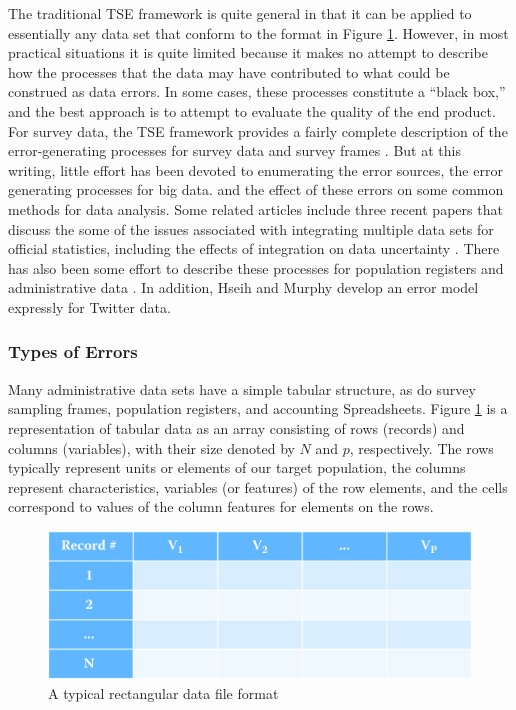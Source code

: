 \documentclass[]{krantz}
\begin{document}
The traditional TSE framework is quite general in that it can be applied
to essentially any data set that conform to the format in Figure
\ref{fig:fig10-1}. However, in most practical situations it is quite
limited because it makes no attempt to describe how the processes that
the data may have contributed to what could be construed as data errors.
In some cases, these processes constitute a ``black box,'' and the best
approach is to attempt to evaluate the quality of the end product. For
survey data, the TSE framework provides a fairly complete description of
the error-generating processes for survey data and survey frames
\citep{biemer2010total}. But at this writing, little effort has been
devoted to enumerating the error sources, the error generating processes
for big data. and the effect of these errors on some common methods for
data analysis. Some related articles include three recent papers that
discuss the some of the issues associated with integrating multiple data
sets for official statistics, including the effects of integration on
data uncertainty
\citetext{\citealp[see][]{Holmberg2017}; \citealp{Reid2017}; \citealp[and][]{Zhang2012}}.
There has also been some effort to describe these processes for
population registers and administrative data
\citep{wallgren2007register}. In addition, Hseih and Murphy
\citeyearpar{Hsieh2017} develop an error model expressly for Twitter
data.

\subsubsection{Types of Errors}\label{types-of-errors}

Many administrative data sets have a simple tabular structure, as do
survey sampling frames, population registers, and accounting
Spreadsheets. Figure \ref{fig:fig10-1} is a representation of tabular
data as an array consisting of rows (records) and columns (variables),
with their size denoted by \(N\) and \(p\), respectively. The rows
typically represent units or elements of our target population, the
columns represent characteristics, variables (or features) of the row
elements, and the cells correspond to values of the column features for
elements on the rows.

\begin{figure}

{\centering \includegraphics[width=0.7\linewidth]{ChapterError/figures/fig10-1} 

}

\caption{A typical rectangular data file format}\label{fig:fig10-1}
\end{figure}
\end{document}
